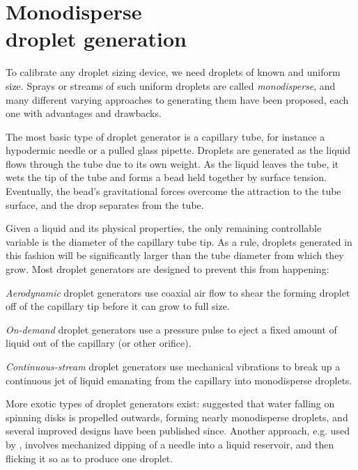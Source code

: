 \documentclass[11.5pt,oneside]{book}
\begin{document}
\chapter[Monodisperse droplet generation]{Monodisperse\\droplet generation}
\label{sec:droplet-generator}

To calibrate any droplet sizing device, we need droplets of known and uniform
size. Sprays or streams of such uniform droplets are called \emph{monodisperse},
and many different varying approaches to generating them have been proposed,
each one with advantages and drawbacks.

The most basic type of droplet generator is a capillary tube, for instance a
hypodermic needle or a pulled glass pipette. Droplets are generated as the
liquid flows through the tube due to its own weight. As the liquid leaves the
tube, it wets the tip of the tube and forms a bead held together by surface
tension. Eventually, the bead's gravitational forces overcome the attraction to
the tube surface, and the drop separates from the tube.

Given a liquid and its physical properties, the only remaining controllable
variable is the diameter of the capillary tube tip. As a rule, droplets
generated in this fashion will be significantly larger than the tube diameter
from which they grow. Most droplet generators are designed to prevent this from
happening:
\begin{alist}
\item \emph{Aerodynamic} droplet generators use coaxial air flow to shear the
    forming droplet off of the capillary tip before it can grow to full size.
\item \emph{On-demand} droplet generators use a pressure pulse to eject a fixed
    amount of liquid out of the capillary (or other orifice).
\item \emph{Continuous-stream} droplet generators use mechanical vibrations to
    break up a continuous jet of liquid emanating from the capillary into
    monodisperse droplets.
\end{alist}
More exotic types of droplet generators exist: \citet{Walton49} suggested that
water falling on spinning disks is propelled outwards, forming nearly
monodisperse droplets, and several improved designs have been published since.
Another approach, e.g. used by \citet{Merritt77}, involves mechanized dipping of
a needle into a liquid reservoir, and then flicking it so as to produce one
droplet.
\end{document}
